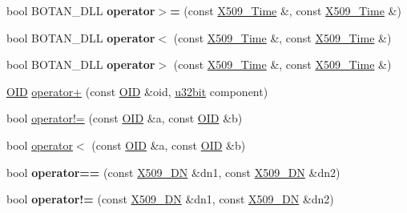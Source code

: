 \begin{DoxyCompactItemize}
\item 
\hypertarget{namespaceBotan_a3310c425a36d0ac797548a735d53bd88}{bool B\-O\-T\-A\-N\-\_\-\-D\-L\-L {\bfseries operator$>$=} (const \hyperlink{classBotan_1_1X509__Time}{X509\-\_\-\-Time} \&, const \hyperlink{classBotan_1_1X509__Time}{X509\-\_\-\-Time} \&)}\label{namespaceBotan_a3310c425a36d0ac797548a735d53bd88}

\item 
\hypertarget{namespaceBotan_a286e258ac757c6b148467ce5fcc26668}{bool B\-O\-T\-A\-N\-\_\-\-D\-L\-L {\bfseries operator$<$} (const \hyperlink{classBotan_1_1X509__Time}{X509\-\_\-\-Time} \&, const \hyperlink{classBotan_1_1X509__Time}{X509\-\_\-\-Time} \&)}\label{namespaceBotan_a286e258ac757c6b148467ce5fcc26668}

\item 
\hypertarget{namespaceBotan_a0eb4c4866b330a5405ea13ecff94cc3a}{bool B\-O\-T\-A\-N\-\_\-\-D\-L\-L {\bfseries operator$>$} (const \hyperlink{classBotan_1_1X509__Time}{X509\-\_\-\-Time} \&, const \hyperlink{classBotan_1_1X509__Time}{X509\-\_\-\-Time} \&)}\label{namespaceBotan_a0eb4c4866b330a5405ea13ecff94cc3a}

\item 
\hyperlink{classBotan_1_1OID}{O\-I\-D} \hyperlink{namespaceBotan_a0ec1aa7780d3e70cec4c9f4ea37a0de4}{operator+} (const \hyperlink{classBotan_1_1OID}{O\-I\-D} \&oid, \hyperlink{namespaceBotan_aacc7d03c95e97e76168fc1c819031830}{u32bit} component)
\item 
bool \hyperlink{namespaceBotan_a628ad693dc802e2920e3a7efdea5d7c8}{operator!=} (const \hyperlink{classBotan_1_1OID}{O\-I\-D} \&a, const \hyperlink{classBotan_1_1OID}{O\-I\-D} \&b)
\item 
bool \hyperlink{namespaceBotan_a39bb1018a3447984046ed00e1450d81c}{operator$<$} (const \hyperlink{classBotan_1_1OID}{O\-I\-D} \&a, const \hyperlink{classBotan_1_1OID}{O\-I\-D} \&b)
\item 
\hypertarget{namespaceBotan_aa6b8eacf2aa21a7d0c567a6bfc8bdd79}{bool {\bfseries operator==} (const \hyperlink{classBotan_1_1X509__DN}{X509\-\_\-\-D\-N} \&dn1, const \hyperlink{classBotan_1_1X509__DN}{X509\-\_\-\-D\-N} \&dn2)}\label{namespaceBotan_aa6b8eacf2aa21a7d0c567a6bfc8bdd79}

\item 
\hypertarget{namespaceBotan_aa2fd6ad64b289ef4fb576882fc6764cf}{bool {\bfseries operator!=} (const \hyperlink{classBotan_1_1X509__DN}{X509\-\_\-\-D\-N} \&dn1, const \hyperlink{classBotan_1_1X509__DN}{X509\-\_\-\-D\-N} \&dn2)}\label{namespaceBotan_aa2fd6ad64b289ef4fb576882fc6764cf}


\end{DoxyCompactItemize}
